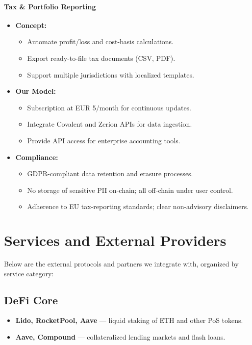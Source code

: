 \documentclass[13pt]{extarticle}
\begin{document}
\paragraph{Tax \& Portfolio Reporting}
\begin{itemize}[left=1em]
  \item \textbf{Concept:}
    \begin{itemize}[left=1.2em]
      \item Automate profit/loss and cost-basis calculations.
      \item Export ready-to-file tax documents (CSV, PDF).
      \item Support multiple jurisdictions with localized templates.
    \end{itemize}
  \item \textbf{Our Model:}
    \begin{itemize}[left=1.2em]
      \item Subscription at EUR 5/month for continuous updates.
      \item Integrate Covalent and Zerion APIs for data ingestion.
      \item Provide API access for enterprise accounting tools.
    \end{itemize}
  \item \textbf{Compliance:}
    \begin{itemize}[left=1.2em]
      \item GDPR-compliant data retention and erasure processes.
      \item No storage of sensitive PII on-chain; all off-chain under user control.
      \item Adherence to EU tax-reporting standards; clear non-advisory disclaimers.
    \end{itemize}
\end{itemize}


\newpage
\section{Services and External Providers}

Below are the external protocols and partners we integrate with, organized by service category:

\subsection{DeFi Core}
\begin{itemize}[left=1em]
  \item \textbf{Lido, RocketPool, Aave} — liquid staking of ETH and other PoS tokens.  
  \item \textbf{Aave, Compound} — collateralized lending markets and flash loans.
\end{itemize}
\end{document}
